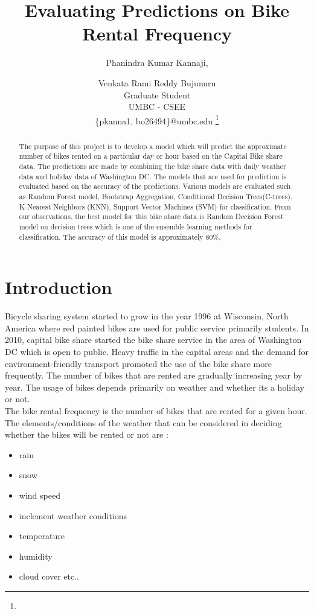 \documentclass[journal, a4paper]{IEEEtran}
\begin{document}
\title{Evaluating Predictions on Bike Rental Frequency}
    \author{
    Phanindra Kumar Kannaji,
\and
Venkata Rami Reddy Bujunuru\\
Graduate Student\\
UMBC - CSEE\\
\{pkanna1, bo26494\}@umbc.edu
    \thanks{}}
    \markboth{}{}
    \maketitle

\begin{abstract}
    The purpose of this project is to develop a model which will predict the approximate number of bikes rented on a particular day or hour based on the Capital Bike share data. The predictions are made by combining the bike share data with daily weather data and holiday data of Washington DC. The models that are used for prediction is evaluated based on the accuracy of the predictions. Various models are evaluated such as Random Forest model, Bootstrap Aggregation, Conditional Decision Trees(C-trees), K-Nearest Neighbors (KNN), Support Vector Machines (SVM) for classification. From our observations, the best model for this bike share data is Random Decision Forest model on decision trees which is one of the ensemble learning methods for classification. The accuracy of this model is approximately 80\%.
\end{abstract}
\setlength{\parindent}{7ex}
\section{Introduction}
    Bicycle sharing system started to grow in the year 1996 at Wisconsin, North America where red painted bikes are used for public service primarily students. In 2010, capital bike share started the bike share service in the area of Washington DC which is open to public. Heavy traffic in the capital areas and the demand for environment-friendly transport promoted the use of the bike share more frequently. The number of bikes that are rented are gradually increasing year by year. The usage of bikes depends primarily on weather and whether its a holiday or not.\\
    \indent The bike rental frequency is the number of bikes that are rented for a given hour. The elements/conditions of the weather that can be considered in deciding whether the bikes will be rented or not are :
    \begin{itemize}
    \item rain
    \item snow
    \item wind speed
    \item inclement weather conditions
    \item temperature
    \item humidity
    \item cloud cover etc..
    \end{itemize}
    
\end{document}
